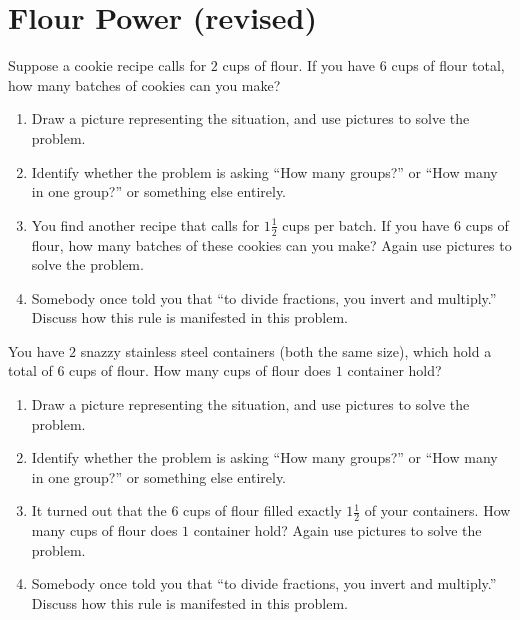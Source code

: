 \newpage
\section{Flour Power (revised)}\label{A:FlourPower}


\begin{prob} 
Suppose a cookie recipe calls for $2$ cups of flour. If you have $6$
cups of flour total, how many batches of cookies can you make?
\begin{enumerate}
\item Draw a picture representing the situation, and use pictures to solve the problem.
\item Identify whether the problem is asking ``How many groups?'' or ``How many in one group?'' or something else entirely.
\item You find another recipe that calls for $1\frac{1}{2}$ cups per batch. If you have $6$ cups of flour, how many batches of these cookies can you make?  Again use pictures to solve the problem.
\item Somebody once told you that ``to divide fractions, you invert and
multiply.'' Discuss how this rule is manifested in this problem.
\end{enumerate}
\end{prob}

\begin{prob} 
You have $2$ snazzy stainless steel containers (both the same size), which hold a total of
$6$ cups of flour. How many cups of flour does $1$ container hold?
\begin{enumerate}
\item Draw a picture representing the situation, and use pictures to solve the problem.
\item Identify whether the problem is asking ``How many groups?'' or ``How many in one group?'' or something else entirely.
\item It turned out that the 6 cups of flour filled exactly $1\frac{1}{2}$ of your containers.  How many cups of flour does $1$ container hold?  Again use pictures to solve the problem.
\item Somebody once told you that ``to divide fractions, you invert and
multiply.'' Discuss how this rule is manifested in this problem.
\end{enumerate}
\end{prob}


%

